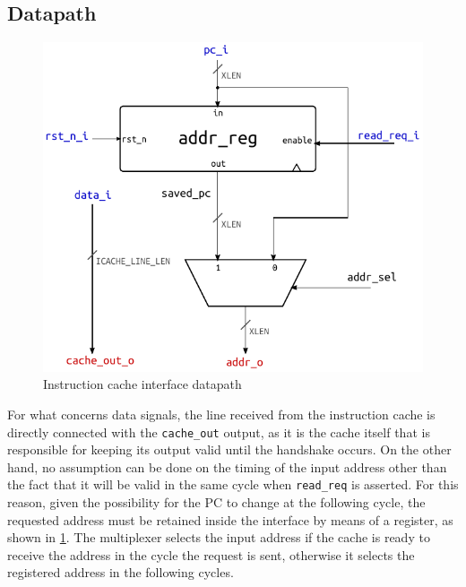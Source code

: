 \subsection{Datapath}
\begin{figure}[hbt]
  \centering
  \includegraphics{img/icache_ifc.pdf}
  \caption{Instruction cache interface datapath}
  \label{fig:icache_ifc}
\end{figure}
For what concerns data signals, the line received from the instruction cache is directly connected with the \texttt{cache\_out} output, as it is the cache itself that is responsible for keeping its output valid until the handshake occurs. On the other hand, no assumption can be done on the timing of the input address other than the fact that it will be valid in the same cycle when \texttt{read\_req} is asserted. For this reason, given the possibility for the \ac{PC} to change at the following cycle, the requested address must be retained inside the interface by means of a register, as shown in \cref{fig:icache_ifc}. The multiplexer selects the input address if the cache is ready to receive the address in the cycle the request is sent, otherwise it selects the registered address in the following cycles.

